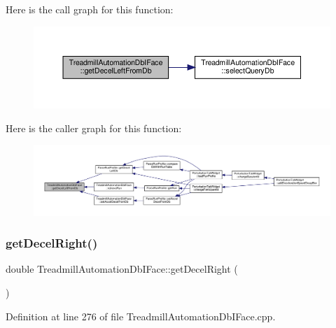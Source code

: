 Here is the call graph for this function\+:
\nopagebreak
\begin{figure}[H]
\begin{center}
\leavevmode
\includegraphics[width=350pt]{class_treadmill_automation_db_i_face_a14c9cb53a3b95f0142bfbdb68fdfa02e_cgraph}
\end{center}
\end{figure}
Here is the caller graph for this function\+:
\nopagebreak
\begin{figure}[H]
\begin{center}
\leavevmode
\includegraphics[width=350pt]{class_treadmill_automation_db_i_face_a14c9cb53a3b95f0142bfbdb68fdfa02e_icgraph}
\end{center}
\end{figure}
\mbox{\label{class_treadmill_automation_db_i_face_afabbddb2f0fd390c6a3109d87d843a16}} 
\subsubsection{\texorpdfstring{get\+Decel\+Right()}{getDecelRight()}}
{\footnotesize\ttfamily double Treadmill\+Automation\+Db\+I\+Face\+::get\+Decel\+Right (\begin{DoxyParamCaption}{ }\end{DoxyParamCaption})}



Definition at line 276 of file Treadmill\+Automation\+Db\+I\+Face.\+cpp.

